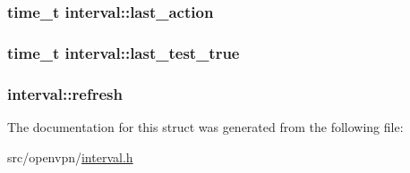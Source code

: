\subsubsection[{last\+\_\+action}]{\setlength{\rightskip}{0pt plus 5cm}time\+\_\+t interval\+::last\+\_\+action}\label{structinterval_a556ca763caea4f4f6c29a899e92e5208}
\hypertarget{structinterval_ad528832ae1d2456710993f56b76fdb26}{}
\subsubsection[{last\+\_\+test\+\_\+true}]{\setlength{\rightskip}{0pt plus 5cm}time\+\_\+t interval\+::last\+\_\+test\+\_\+true}\label{structinterval_ad528832ae1d2456710993f56b76fdb26}
\hypertarget{structinterval_aaecafe7bd134ec05631da6d0ea390589}{}
\subsubsection[{refresh}]{ interval\+::refresh}\label{structinterval_aaecafe7bd134ec05631da6d0ea390589}


The documentation for this struct was generated from the following file\+:\begin{DoxyCompactItemize}
\item 
src/openvpn/\hyperlink{interval_8h}{interval.\+h}\end{DoxyCompactItemize}
